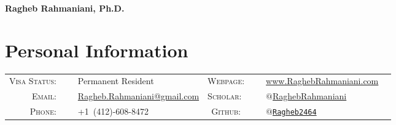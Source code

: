 \documentclass[10PT,letter]{article}
\title{}
\newcommand{\numbox}[1]{} %
\begin{document}
\noindent{}%
{
	\fontsize{34}{36}\mdseries\upshape\sffamily\bfseries Ragheb Rahmaniani, Ph.D.
}
\vspace{1.0cm}

\section*{\numbox{1}\bfseries\textcolor{titlecol}{\sffamily Personal Information}}
              \begin{tabular}{rlcrl}
	               \small\textsc{Visa Status:}~~~ & \small Permanent Resident 	
	               																					& \small\textsc{Webpage:}~~~ &  \multicolumn{1}{l}{
	               																						\small \href{http://www.raghebrahmaniani.com/}{{www.RaghebRahmaniani.com }}
	               																					}
	               \\[.5mm]
	               
	                \small\textsc{Email:}~~~ & \small {\href{mailto:ragheb.rahmaniani@gmail.com}{Ragheb.Rahmaniani@gmail.com}}   
	                																				& \small\textsc{Scholar:} ~~~ &  \multicolumn{1}{l}{
	                																					\small  \small\href{https://scholar.google.com/citations?user=3V2o0Q0AAAAJ\&hl=en}{$@$RaghebRahmaniani}
	                																				}
	                \\[.5mm]
	                \small\textsc{Phone:}~~~ & \small +1~(412)-608-8472   
	                																				&  \small\textsc{Github:}~~~ & \multicolumn{1}{l}{
	                																					\small \small\href{https://github.com/Ragheb2464}{\texttt{$@$Ragheb2464}}  
                																					}
					\\[.5mm]	               
     \end{tabular}
\end{document}
